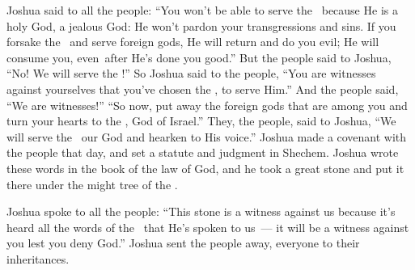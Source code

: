 \begin{inparaenum}
   Joshua said to all the people: ``You won't be able to serve the \lord\ because He is a holy God, a jealous God: He won't pardon your transgressions and sins.%
   If you forsake the \lord\ and serve foreign gods, He will return and do you evil; He will consume you, even\understood{}\ after He's done you good.''%
   But the people said to Joshua, ``No! We will serve the \lord!''%
   So Joshua said to the people, ``You are witnesses against yourselves that you've chosen the \lord, to serve Him.'' And the people said, ``We are witnesses!''%
   ``So now, put away the foreign gods that are among you and turn your hearts to the \lord, God of Israel.''%
   They, the people, said to Joshua, ``We will serve the \lord\ our God and hearken to His voice.''%
   Joshua made a covenant with the people that day, and set a statute and judgment in Shechem.%
   Joshua wrote these words in the book of the law of God, and he took a great stone and put it there under the might tree of the \lord.%

   Joshua spoke to all the people: ``This stone is a witness against us because it's heard all the words of the \lord\ that He's spoken to us~--- it will be a witness against you lest you deny God.''%
   Joshua sent the people away, everyone to their inheritances.%


\end{inparaenum}
